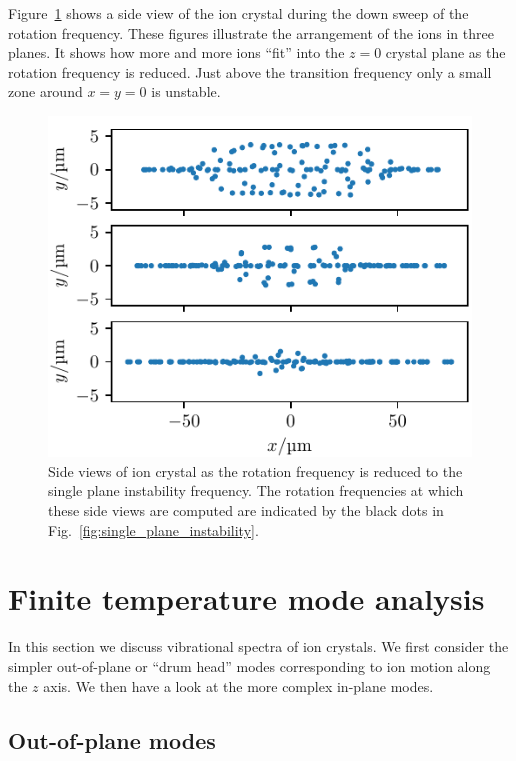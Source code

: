 \documentclass[aps, pra, preprint]{revtex4-1}
\begin{document}
Figure~\ref{fig:side_views_single_plane_instability} shows a side
view of the ion crystal during the down sweep of the rotation
frequency. These figures illustrate the arrangement of the ions
in three planes. It shows how more and more ions ``fit'' into the
$z=0$ crystal plane as the rotation frequency is reduced. Just
above the transition frequency only a small zone around $x=y=0$
is unstable.
\begin{figure}
  \includegraphics{./figures/fig_side_views_single_plane_instability.pdf}
  \caption{Side views of ion crystal as the rotation frequency is
    reduced to the single plane instability frequency. The
    rotation frequencies at which these side views are computed
    are indicated by the black dots in
    Fig.~\ref{fig:single_plane_instability}.}
  \label{fig:side_views_single_plane_instability}
\end{figure}


\section{Finite temperature mode analysis}

In this section we discuss vibrational spectra of ion crystals.
We first consider the simpler out-of-plane or ``drum head'' modes
corresponding to ion motion along the $z$ axis. We then have a
look at the more complex in-plane modes.


\subsection{Out-of-plane modes}
\end{document}

